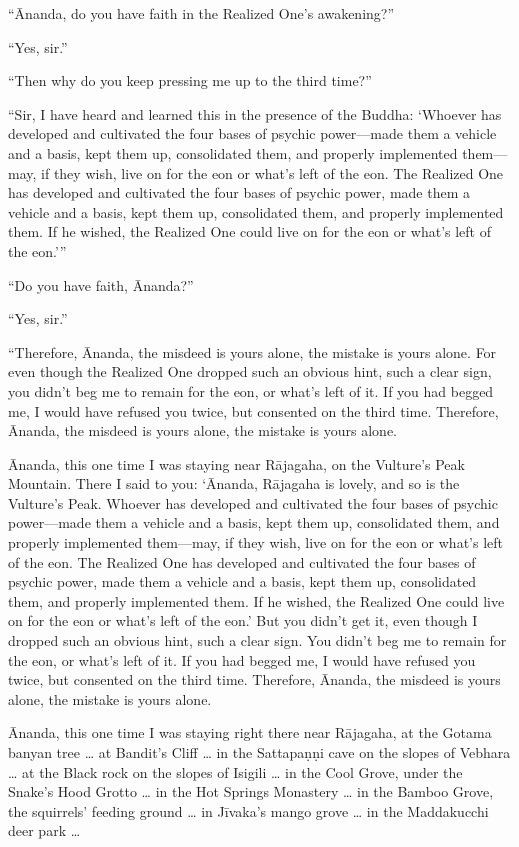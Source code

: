 \documentclass[12pt,openany]{book}%
\begin{document}
“Ānanda, do you have faith in the Realized One’s awakening?” 

“Yes, sir.” 

“Then why do you keep pressing me up to the third time?” 

“Sir, I have heard and learned this in the presence of the Buddha: ‘Whoever has developed and cultivated the four bases of psychic power—made them a vehicle and a basis, kept them up, consolidated them, and properly implemented them—may, if they wish, live on for the eon or what’s left of the eon. The Realized One has developed and cultivated the four bases of psychic power, made them a vehicle and a basis, kept them up, consolidated them, and properly implemented them. If he wished, the Realized One could live on for the eon or what’s left of the eon.’” 

“Do you have faith, Ānanda?” 

“Yes, sir.” 

“Therefore, Ānanda, the misdeed is yours alone, the mistake is yours alone. For even though the Realized One dropped such an obvious hint, such a clear sign, you didn’t beg me to remain for the eon, or what’s left of it. If you had begged me, I would have refused you twice, but consented on the third time. Therefore, Ānanda, the misdeed is yours alone, the mistake is yours alone. 

Ānanda, this one time I was staying near \textsanskrit{Rājagaha}, on the Vulture’s Peak Mountain. There I said to you: ‘Ānanda, \textsanskrit{Rājagaha} is lovely, and so is the Vulture’s Peak. Whoever has developed and cultivated the four bases of psychic power—made them a vehicle and a basis, kept them up, consolidated them, and properly implemented them—may, if they wish, live on for the eon or what’s left of the eon. The Realized One has developed and cultivated the four bases of psychic power, made them a vehicle and a basis, kept them up, consolidated them, and properly implemented them. If he wished, the Realized One could live on for the eon or what’s left of the eon.’ But you didn’t get it, even though I dropped such an obvious hint, such a clear sign. You didn’t beg me to remain for the eon, or what’s left of it. If you had begged me, I would have refused you twice, but consented on the third time. Therefore, Ānanda, the misdeed is yours alone, the mistake is yours alone. 

Ānanda, this one time I was staying right there near \textsanskrit{Rājagaha}, at the Gotama banyan tree … at Bandit’s Cliff … in the \textsanskrit{Sattapaṇṇi} cave on the slopes of Vebhara … at the Black rock on the slopes of Isigili … in the Cool Grove, under the Snake’s Hood Grotto … in the Hot Springs Monastery … in the Bamboo Grove, the squirrels’ feeding ground … in \textsanskrit{Jīvaka}’s mango grove … in the Maddakucchi deer park … 
\end{document}
